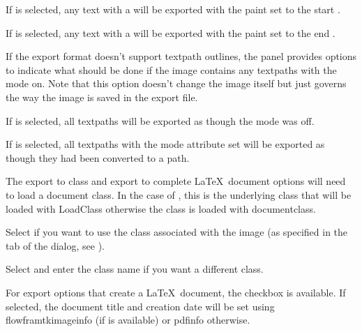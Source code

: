 If  is selected, any text
with a  will be exported with the paint set to
the start .


If  is selected, any text
with a  will be exported with the paint set to
the end .


If the export format doesn't support \gls{textpath} outlines, the
 panel provides options to indicate
what should be done if the image contains any \glspl{textpath} with 
the  mode on. Note that this option doesn't change
the image itself but just governs the way the image is saved in the export
file.


If  is selected, all
\glspl{textpath} will be exported as though the  mode
was off.


If  is selected, all
\glspl{textpath} with the  mode attribute set 
will be exported as though they had been converted to a path.


The export to class and export to complete \LaTeX\ document options will
need to load a document class.  In the case of ,
this is the underlying class that will be loaded with
\gls{LoadClass} otherwise the class is loaded with
\gls{documentclass}.


Select  if you want to use the
class associated with the image (as specified in the
 tab of the  dialog,
see ).


Select  and enter the class
name if you want a different class.


For export options that create a \LaTeX\ document, the
 checkbox is available. If selected, 
the document title and creation date will be set
using \gls{flowframtkimageinfo} (if  is
available) or \gls{pdfinfo} otherwise.

